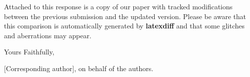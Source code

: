 \documentclass{article}
\begin{document}
Attached to this response is a copy of our paper with tracked modifications between the previous submission and the updated version. Please be aware that this comparison is automatically generated by {\bf latexdiff} and that some glitches and aberrations may appear.

Yours Faithfully,

[Corresponding author], on behalf of the authors.

% 

\vfill
\end{document}
